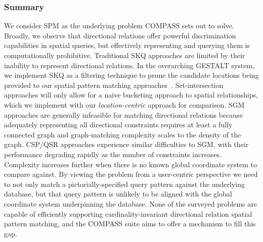 \subsubsection{Summary}
\par{
    We consider SPM as the underlying problem COMPASS sets out to solve. 
    Broadly, we observe that directional relations offer powerful discrimination capabilities in spatial queries, but effectively representing and querying them is computationally prohibitive. 
    Traditional SKQ approaches are limited by their inability to represent directional relations. In the overarching GESTALT system, we implement SKQ as a filtering technique to prune the candidate locations being provided to our spatial pattern matching approaches~\cite{Osul2023}.
    Set-intersection approaches will only allow for a naive bucketing approach to spatial relationships, which we implement with our \textit{location-centric} approach for comparison.
    SGM approaches are generally infeasible for matching directional relations because adequately representing all directional constraints requires at least a fully connected graph and graph-matching complexity scales to the density of the graph.
    CSP/QSR approaches experience similar difficulties to SGM, with their performance degrading rapidly as the number of constraints increases.
    Complexity increases further when there is no known global coordinate system to compare against. 
    By viewing the problem from a user-centric perspective we need to not only match a pictorially-specified query pattern against the underlying database, but that query pattern is unlikely to be aligned with the global coordinate system underpinning the database. 
    None of the surveyed problems are capable of efficiently supporting cardinality-invariant directional relation spatial pattern matching, and the COMPASS suite aims to offer a mechanism to fill this gap. 
}



